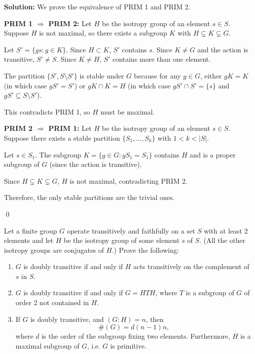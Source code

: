 \noindent\textbf{Solution:} We prove the equivalence of PRIM 1 and PRIM 2.

\textbf{PRIM 1 $\Rightarrow$ PRIM 2:} Let $H$ be the isotropy group of an element $s \in S$. Suppose $H$ is not maximal, so there exists a subgroup $K$ with $H \subsetneq K \subsetneq G$.

Let $S' = \{gs : g \in K\}$. Since $H \subset K$, $S'$ contains $s$. Since $K \neq G$ and the action is transitive, $S' \neq S$. Since $K \neq H$, $S'$ contains more than one element.

The partition $\{S', S \setminus S'\}$ is stable under $G$ because for any $g \in G$, either $gK = K$ (in which case $gS' = S'$) or $gK \cap K = H$ (in which case $gS' \cap S' = \{s\}$ and $gS' \subseteq S \setminus S'$).

This contradicts PRIM 1, so $H$ must be maximal.

\textbf{PRIM 2 $\Rightarrow$ PRIM 1:} Let $H$ be the isotropy group of an element $s \in S$. Suppose there exists a stable partition $\{S_1, \ldots, S_k\}$ with $1 < k < |S|$.

Let $s \in S_1$. The subgroup $K = \{g \in G : gS_1 = S_1\}$ contains $H$ and is a proper subgroup of $G$ (since the action is transitive).

Since $H \subsetneq K \subsetneq G$, $H$ is not maximal, contradicting PRIM 2.

Therefore, the only stable partitions are the trivial ones.


\qed
\begin{problembox}
Let a finite group $G$ operate transitively and faithfully on a set $S$ with at least 2 elements and let $H$ be the isotropy group of some element $s$ of $S$. (All the other isotropy groups are conjugates of $H$.) Prove the following:
\begin{enumerate}[label=(\alph*)]
\item $G$ is doubly transitive if and only if $H$ acts transitively on the complement of $s$ in $S$.
\item $G$ is doubly transitive if and only if $G = HTH$, where $T$ is a subgroup of $G$ of order 2 not contained in $H$.
\item If $G$ is doubly transitive, and $(G : H) = n$, then
\[\#(G) = d(n - 1)n,\]
where $d$ is the order of the subgroup fixing two elements. Furthermore, $H$ is a maximal subgroup of $G$, i.e. $G$ is primitive.
\end{enumerate}
\end{problembox}

